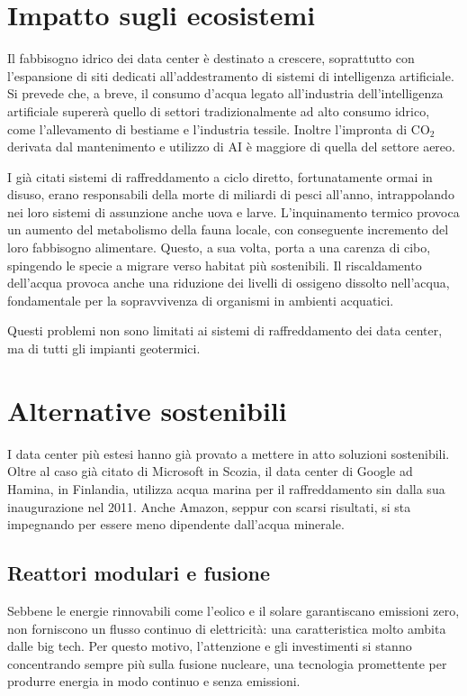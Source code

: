 \documentclass[12pt,a4paper,oneside]{book}
\begin{document}
\section{Impatto sugli ecosistemi}
Il fabbisogno idrico dei data center è destinato a crescere, soprattutto con l'espansione di siti dedicati all'addestramento di sistemi di intelligenza artificiale. Si prevede che, a breve, il consumo d'acqua legato all'industria dell'intelligenza artificiale supererà quello di settori tradizionalmente ad alto consumo idrico, come l'allevamento di bestiame e l'industria tessile. Inoltre l'impronta di CO$_2$ derivata dal mantenimento e utilizzo di AI è maggiore di quella del settore aereo.

I già citati sistemi di raffreddamento a ciclo diretto, fortunatamente ormai in disuso, erano responsabili della morte di miliardi di pesci all'anno, intrappolando nei loro sistemi di assunzione anche uova e larve. L'inquinamento termico provoca un aumento del metabolismo della fauna locale, con conseguente incremento del loro fabbisogno alimentare. Questo, a sua volta, porta a una carenza di cibo, spingendo le specie a migrare verso habitat più sostenibili. Il riscaldamento dell'acqua provoca anche una riduzione dei livelli di ossigeno dissolto nell'acqua, fondamentale per la sopravvivenza di organismi in ambienti acquatici.

Questi problemi non sono limitati ai sistemi di raffreddamento dei data center, ma di tutti gli impianti geotermici.

\section{Alternative sostenibili}

I data center più estesi hanno già provato a mettere in atto soluzioni sostenibili. Oltre al caso già citato di Microsoft in Scozia, il data center di Google ad Hamina, in Finlandia, utilizza acqua marina per il raffreddamento sin dalla sua inaugurazione nel 2011. Anche Amazon, seppur con scarsi risultati, si sta impegnando per essere meno dipendente dall'acqua minerale.

\subsection{Reattori modulari e fusione}
Sebbene le energie rinnovabili come l'eolico e il solare garantiscano emissioni zero, non forniscono un flusso continuo di elettricità: una caratteristica molto ambita dalle big tech. Per questo motivo, l'attenzione e gli investimenti si stanno concentrando sempre più sulla fusione nucleare, una tecnologia promettente per produrre energia in modo continuo e senza emissioni.
\end{document}
